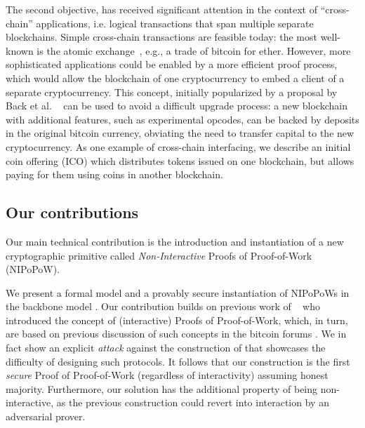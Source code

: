 %
The second objective, has received  significant attention in the context of
``cross-chain'' applications, i.e. logical transactions that span multiple
separate blockchains. Simple cross-chain transactions are feasible today: the
most well-known is the atomic exchange~\cite{tiernolan}, e.g., a trade of
bitcoin for ether. However, more sophisticated applications could be enabled by
a more efficient proof process, which would allow the blockchain of one
cryptocurrency to embed a client of a separate cryptocurrency. This concept,
initially popularized by a proposal by Back et al. ~\cite{sidechains} can be
used to avoid a difficult upgrade process: a new blockchain with additional
features, such as experimental opcodes, can be backed by deposits in the
original bitcoin currency, obviating the need to transfer capital to the new
cryptocurrency. As one example of cross-chain interfacing, we describe an
initial coin offering (ICO) which distributes tokens issued on one blockchain,
but allows paying for them using coins in another blockchain.


\subsection{Our contributions}
Our main technical contribution is the introduction and instantiation of a new
cryptographic primitive called \textit{Non-Interactive} Proofs of Proof-of-Work
(NIPoPoW).

We present a formal model and a provably secure instantiation of NIPoPoWs in the
backbone model \cite{backbone}. Our contribution builds on previous work  of
~\cite{KLS} who introduced the concept of (interactive) Proofs of Proof-of-Work,
which, in turn, are based on previous discussion of such concepts in the bitcoin
forums \cite{highway}. We in fact show an explicit \emph{attack} against the
construction of \cite{KLS} that showcases the difficulty of designing such
protocols. It follows that our construction is the first \textit{secure} Proof
of Proof-of-Work (regardless of interactivity) assuming honest majority.
Furthermore, our solution has the additional property of being non-interactive,
as the previous construction could revert into interaction by an adversarial
prover.

